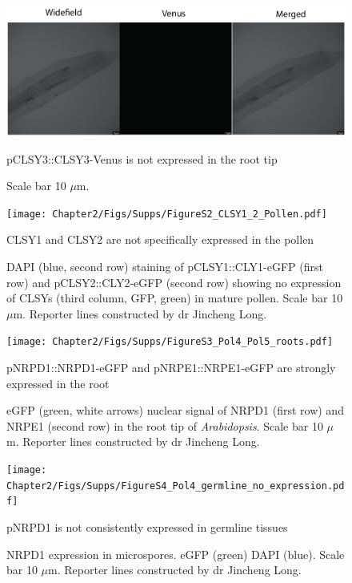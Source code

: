 
\begin{figure}[htbp!] 
\centering    
    \includegraphics[width=1\textwidth]{Chapter2/Figs/Supps/FigureS1_CLSY3_Root_tip_neg.pdf}
\caption{pCLSY3::CLSY3-Venus is not expressed in the root tip}
\label{fig:clsy3_root}
\captionsetup{font=small}
    \caption*{Scale bar 10 $\mu$m.}
\end{figure}

\begin{figure}[htbp!] 
\centering    
    \texttt{[image: Chapter2/Figs/Supps/FigureS2\_CLSY1\_2\_Pollen.pdf]}
\caption{CLSY1 and CLSY2 are not specifically expressed in the pollen}
\label{fig:clsy1_2_pollen}
\captionsetup{font=small}
    \caption*{DAPI (blue, second row) staining of pCLSY1::CLY1-eGFP (first row) and pCLSY2::CLY2-eGFP (second row) showing no expression of CLSYs (third column, GFP, green) in mature pollen. Scale bar 10 $\mu$m. Reporter lines constructed by dr Jincheng Long.}
\end{figure}

\begin{figure}[htbp!] 
\centering    
    \texttt{[image: Chapter2/Figs/Supps/FigureS3\_Pol4\_Pol5\_roots.pdf]}
\caption{pNRPD1::NRPD1-eGFP and pNRPE1::NRPE1-eGFP are strongly expressed in the root}
\label{fig:Pol4_5_roots}
\captionsetup{font=small}
    \caption*{eGFP (green, white arrows) nuclear signal of NRPD1 (first row) and NRPE1 (second row) in the root tip of \textit{Arabidopsis}. Scale bar 10 $\mu$m. Reporter lines constructed by dr Jincheng Long.}
\end{figure}

\begin{figure}[htbp!] 
\centering    
    \texttt{[image: Chapter2/Figs/Supps/FigureS4\_Pol4\_germline\_no\_expression.pdf]}
\caption{pNRPD1 is not consistently expressed in germline tissues}
\label{fig:Pol4_germ_no_expression}
\captionsetup{font=small}
    \caption*{NRPD1 expression in microspores. eGFP (green) DAPI (blue). Scale bar 10 $\mu$m. Reporter lines constructed by dr Jincheng Long.}
\end{figure}

